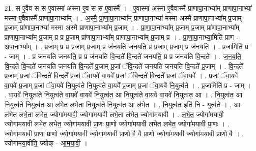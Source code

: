 \documentclass[17pt]{extarticle}
\begin{document}
21. स ए॒वैव स स ए॒वास्मा॑ अस्मा ए॒व स स ए॒वास्मै᳚ । . ए॒वास्मा॑ अस्मा ए॒वैवास्मै᳚ प्राणापा॒नाभ्या᳚म् प्राणापा॒नाभ्या॑ मस्मा ए॒वैवास्मै᳚ प्राणापा॒नाभ्या᳚म् । . अ॒स्मै॒ प्रा॒णा॒पा॒नाभ्या᳚म् प्राणापा॒नाभ्या॑ मस्मा अस्मै प्राणापा॒नाभ्या᳚म् प्र॒जाम् प्र॒जाम् प्रा॑णापा॒नाभ्या॑ मस्मा अस्मै प्राणापा॒नाभ्या᳚म् प्र॒जाम् । . प्रा॒णा॒पा॒नाभ्या᳚म् प्र॒जाम् प्र॒जाम् प्रा॑णापा॒नाभ्या᳚म् प्राणापा॒नाभ्या᳚म् प्र॒जाम् प्र प्र प्र॒जाम् प्रा॑णापा॒नाभ्या᳚म् प्राणापा॒नाभ्या᳚म् प्र॒जाम् प्र । . प्रा॒णा॒पा॒नाभ्या॒मिति॑ प्राण - अ॒पा॒नाभ्या᳚म् । . प्र॒जाम् प्र प्र प्र॒जाम् प्र॒जाम् प्र ज॑नयति जनयति॒ प्र प्र॒जाम् प्र॒जाम् प्र ज॑नयति । . प्र॒जामिति॑ प्र - जाम् । . प्र ज॑नयति जनयति॒ प्र प्र ज॑नयति वि॒न्दते॑ वि॒न्दते॑ जनयति॒ प्र प्र ज॑नयति वि॒न्दते᳚ । . ज॒न॒य॒ति॒ वि॒न्दते॑ वि॒न्दते॑ जनयति जनयति वि॒न्दते᳚ प्र॒जाम् प्र॒जां ॅवि॒न्दते॑ जनयति जनयति वि॒न्दते᳚ प्र॒जाम् । . वि॒न्दते᳚ प्र॒जाम् प्र॒जां ॅवि॒न्दते॑ वि॒न्दते᳚ प्र॒जां ॅवा॒यवे॑ वा॒यवे᳚ प्र॒जां ॅवि॒न्दते॑ वि॒न्दते᳚ प्र॒जां ॅवा॒यवे᳚ । . प्र॒जां ॅवा॒यवे॑ वा॒यवे᳚ प्र॒जाम् प्र॒जां ॅवा॒यवे॑ नि॒युत्व॑ते नि॒युत्व॑ते वा॒यवे᳚ प्र॒जाम् प्र॒जां ॅवा॒यवे॑ नि॒युत्व॑ते । . प्र॒जामिति॑ प्र - जाम् । . वा॒यवे॑ नि॒युत्व॑ते नि॒युत्व॑ते वा॒यवे॑ वा॒यवे॑ नि॒युत्व॑त॒ आ नि॒युत्व॑ते वा॒यवे॑ वा॒यवे॑ नि॒युत्व॑त॒ आ । . नि॒युत्व॑त॒ आ नि॒युत्व॑ते नि॒युत्व॑त॒ आ ल॑भेत लभे॒ता नि॒युत्व॑ते नि॒युत्व॑त॒ आ ल॑भेत । . नि॒युत्व॑त॒ इति॑ नि - युत्व॑ते । . आ ल॑भेत लभे॒ता ल॑भेत॒ ज्योगा॑मयावी॒ ज्योगा॑मयावी लभे॒ता ल॑भेत॒ ज्योगा॑मयावी । . ल॒भे॒त॒ ज्योगा॑मयावी॒ ज्योगा॑मयावी लभेत लभेत॒ ज्योगा॑मयावी प्रा॒णः प्रा॒णो ज्योगा॑मयावी लभेत लभेत॒ ज्योगा॑मयावी प्रा॒णः । . ज्योगा॑मयावी प्रा॒णः प्रा॒णो ज्योगा॑मयावी॒ ज्योगा॑मयावी प्रा॒णो वै वै प्रा॒णो ज्योगा॑मयावी॒ ज्योगा॑मयावी प्रा॒णो वै । . ज्योगा॑मया॒वीति॒ ज्योक् - आ॒म॒या॒वी॒ । \newline
\end{document}
